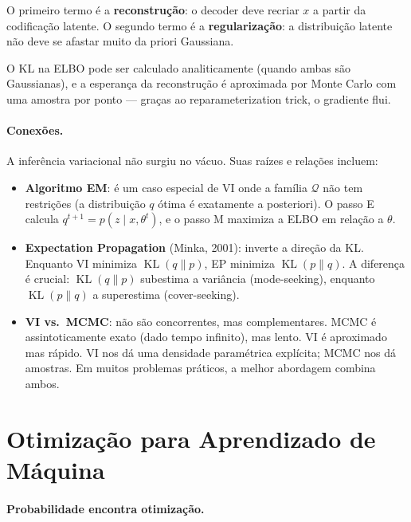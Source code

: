 \documentclass{tufte-handout}
\DeclareMathOperator{\KL}{KL}
\begin{document}
O primeiro termo é a \textbf{reconstrução}: o decoder deve recriar $x$ a partir da
codificação latente. O segundo termo é a \textbf{regularização}: a distribuição
latente não deve se afastar muito da priori Gaussiana.

\begin{remark}
    O KL na ELBO pode ser calculado analiticamente (quando ambas são Gaussianas),
    e a esperança da reconstrução é aproximada por Monte Carlo com uma amostra
    por ponto --- graças ao reparameterization trick, o gradiente flui.
\end{remark}

\paragraph{Conexões.}

A inferência variacional não surgiu no vácuo. Suas raízes e relações incluem:

\begin{itemize}
    \item \textbf{Algoritmo EM}: é um caso especial de VI onde a família
    $\mathcal{Q}$ não tem restrições (a distribuição $q$ ótima é exatamente a
    posteriori). O passo E calcula $q^{t+1} = p(z \mid x, \theta^t)$, e o passo M
    maximiza a ELBO em relação a $\theta$.
    \item \textbf{Expectation Propagation} (Minka, 2001): inverte a direção da KL.
    Enquanto VI minimiza $\KL(q \parallel p)$, EP minimiza $\KL(p \parallel q)$.
    A diferença é crucial: $\KL(q \parallel p)$ subestima a variância (mode-seeking),
    enquanto $\KL(p \parallel q)$ a superestima (cover-seeking).
    \item \textbf{VI vs.\ MCMC}: não são concorrentes, mas complementares. MCMC é
    assintoticamente exato (dado tempo infinito), mas lento. VI é aproximado mas
    rápido. VI nos dá uma densidade paramétrica explícita; MCMC nos dá amostras.
    Em muitos problemas práticos, a melhor abordagem combina ambos.
\end{itemize}

\section{Otimização para Aprendizado de Máquina}

\paragraph{Probabilidade encontra otimização.}
\end{document}
